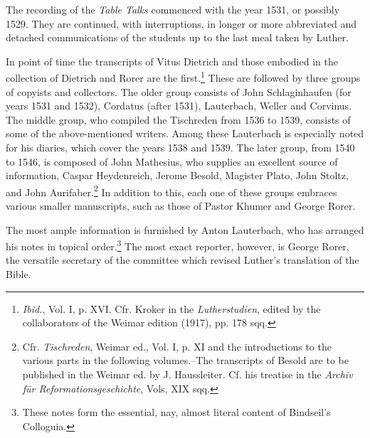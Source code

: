 The recording of the \textit{Table Talks} commenced with the year 1531,
or possibly 1529. They are continued, with interruptions, in longer or
more abbreviated and detached communications of the students up to
the last meal taken by Luther.

In point of time the transcripts of Vitus Dietrich and those embodied in
the collection of Dietrich and Rorer are the first.\footnote{\textit{Ibid.},
Vol. I, p. XVI. Cfr. Kroker in the \textit{Lutherstudien}, edited by the
collaborators of the Weimar edition (1917), pp. 178 sqq.}
These are followed by three groups of copyists and collectors. The older group consists of John
Schlaginhaufen (for years 1531 and 1532), Cordatus (after 1531), Lauterbach,
Weller and Corvinus. The middle group, who compiled the Tischreden
from 1536 to 1539, consists of some of the above-mentioned writers. Among
these Lauterbach is especially noted for his diaries, which cover the years
1538 and 1539. The later group, from 1540 to 1546, is composed of John
Mathesius, who supplies an excellent source of information, Caspar Heydenreich,
Jerome Besold, Magister Plato, John Stoltz, and John Aurifaber.\footnote
{Cfr. \textit{Tischreden}, Weimar ed., Vol. I, p. XI and the introductions to the various parts in
the following volumes.--The transcripts of Besold are to be published in the Weimar ed.
by J. Haussleiter. Cf. his treatise in the \textit{Archiv für
Reformationsgeschichte}, Vols, XIX sqq.} In addition to this, each one of these
groups embraces various smaller manuscripts,
such as those of Pastor Khumer and George Rorer.

The most ample information is furnished by Anton Lauterbach, who has
arranged his notes in topical order.\footnote{These notes form the essential, nay, almost literal content of Bindseil’s Colloguia.}
 The most exact reporter, however, is
George Rorer, the versatile secretary of the committee which revised Luther’s
translation of the Bible.

